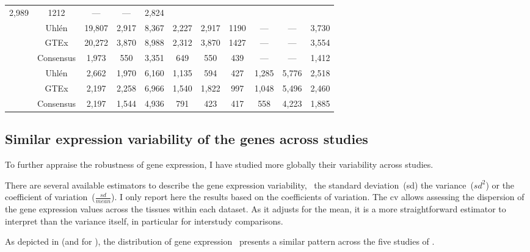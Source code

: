 \begin{sidewaystable}
\begin{tabular}{@{}ccccccccccc@{}}
2,989  & 1212  & --- & --- & 2,824  \\
& Uhlén & 19,807 & 2,917 & 8,367 & 2,227 &
2,917  & 1190  & --- & --- & 3,730  \\
& GTEx & 20,272 & 3,870 & 8,988  & 2,312 &
3,870  & 1427  & --- & --- & 3,554  \\
\cmidrule(l){2-11}
& Consensus & 1,973 & 550 & 3,351 & 649 &
550  & 439 & --- & --- & 1,412  \\
\midrule
\multirow{3}{*}{\rotatebox[origin=c]{90}{\parbox[c]{1.7cm}{\centering
Common\\23-tissues\\combined datasets}}} & Uhlén & 2,662  & 1,970  &
6,160 & 1,135 & 594  & 427 & 1,285 &
5,776 & 2,518 \\
& GTEx & 2,197 & 2,258 & 6,966  & 1,540 &
1,822  & 997 & 1,048 & 5,496  & 2,460 \\
\cmidrule(l){2-11}
& Consensus & 2,197 & 1,544 & 4,936 & 791 &
423 & 417 & 558 & 4,223 & 1,885 \\
\bottomrule
\end{tabular}
\end{sidewaystable}

\subsection{Similar expression variability of the genes across studies\quad}
\vspace{-5mm}
To further appraise the robustness of gene expression,
I have studied more globally their variability across studies.

There are several available estimators to describe the gene expression variability,
\eg\ the standard deviation~(sd) the variance~($sd^2$) or the coefficient of
variation~($\frac{sd}{mean}$).
I only report here the results based on the coefficients of variation.
The \gls{cv} allows assessing
the dispersion of the gene expression values
across the tissues within each dataset.
As it adjusts for the mean,
it is a more straightforward estimator to interpret than
the variance itself,
in particular for interstudy comparisons.\mybr\

As depicted in  (and  for \setTwo),
the distribution of gene expression \cvs\ presents a similar pattern
across the five studies of \setOne.\mybr\

